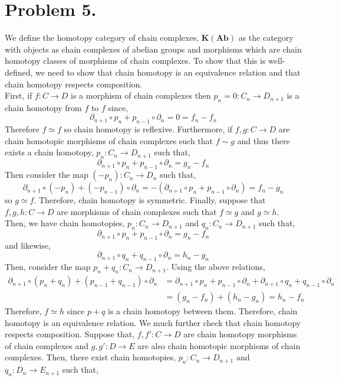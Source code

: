 \documentclass[12pt]{extarticle}
\begin{document}
\section*{Problem 5.}

We define the homotopy category of chain complexes, $\mathbf{K(Ab)}$ as the category with objects as chain complexes of abelian groups and morphisms which are chain homotopy classes of morphisms of chain complexes. To show that this is well-defined, we need to show that chain homotopy is an equivalence relation and that chain homotopy respects composition.
\bigskip\\
First, if $f : C \to D$ is a morphism of chain complexes then $p_n = 0 : C_n \to D_{n+1}$ is a chain homotopy from $f$ to $f$ since,
\[ \partial_{n+1} \circ p_n + p_{n-1} \circ \partial_{n} = 0 = f_n - f_n\]
Therefore $f \simeq f$ so chain homotopy is reflexive. 
Furthermore, if $f, g : C \to D$ are chain homotopic morphisms of chain complexes such that $f \sim g$ and thus there exists a chain homotopy, $p_n : C_{n} \to D_{n+1}$ such that,
\[ \partial_{n+1} \circ p_n + p_{n-1} \circ \partial_{n} = g_n - f_n\] 
Then consider the map $(-p_n) : C_n \to D_n$ such that,
\[ \partial_{n+1} \circ (-p_n) + (-p_{n-1}) \circ \partial_{n} = -(\partial_{n+1} \circ p_n + p_{n-1} \circ \partial_{n}) = f_n - g_n\]
so $g \simeq f$. Therefore, chain homotopy is symmetric. Finally,
suppose that $f,g,h : C \to D$ are morphisms of chain complexes such that $f \simeq g$ and $g \simeq h$. Then, we have chain homotopies, $p_n : C_n \to D_{n+1}$ and $q_n : C_n \to D_{n+1}$ such that,
\[ \partial_{n+1} \circ p_n + p_{n-1} \circ \partial_n = g_n - f_n \]
and likewise,
\[ \partial_{n+1} \circ q_n + q_{n-1} \circ \partial_n = h_n - g_n\]
Then, consider the map $p_n + q_n : C_n \to D_{n+1}$. Using the above relations,
\begin{align*}
\partial_{n+1} \circ (p_n + q_n) + (p_{n-1} + q_{n-1}) \circ \partial_n  & = \partial_{n+1} \circ p_n + p_{n-1} \circ \partial_n + \partial_{n+1} \circ q_n + q_{n-1} \circ \partial_n 
\\
& = (g_n - f_n) + (h_n - g_n) = h_n - f_n
\end{align*}
Therefore, $f \simeq h$ since $p + q$ is a chain homotopy between them. Therefore, chain homotopy is an equivalence relation. We much further check that chain homotopy respects composition. Suppose that,
$f, f' : C \to D$ are chain homotopy morphisms of chain complexes and $g, g' : D \to E$ are also chain homotopic morphisms of chain complexes. Then, there exist chain homotopies, $p_n : C_n \to D_{n+1}$ and $q_n : D_n \to E_{n+1}$ such that,
\end{document}
